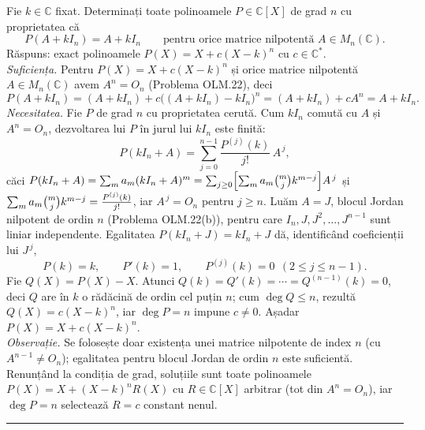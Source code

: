 Fie $k\in\mathbb{C}$ fixat. Determinați toate polinoamele $P\in\mathbb{C}[X]$ de grad $n$ cu proprietatea că
\[ P(A+kI_n)=A+kI_n\qquad\text{pentru orice matrice nilpotentă } A\in M_n(\mathbb{C}). \]
\sol Răspuns: exact polinoamele $P(X)=X+c(X-k)^n$ cu $c\in\mathbb{C}^{*}$.\\[2pt]
\emph{Suficiența.} Pentru $P(X)=X+c(X-k)^n$ și orice matrice nilpotentă $A\in M_n(\mathbb{C})$ avem $A^n=O_n$ (Problema OLM.22), deci
\[ P(A+kI_n)=(A+kI_n)+c\bigl((A+kI_n)-kI_n\bigr)^n=(A+kI_n)+cA^n=A+kI_n. \]
\emph{Necesitatea.} Fie $P$ de grad $n$ cu proprietatea cerută. Cum $kI_n$ comută cu $A$ și $A^n=O_n$, dezvoltarea lui $P$ în jurul lui $kI_n$ este finită:
\[ P(kI_n+A)=\sum_{j=0}^{n-1}\frac{P^{(j)}(k)}{j!}\,A^{\,j}, \]
căci $P(kI_n+A)=\sum_m a_m(kI_n+A)^m=\sum_{j\ge0}\Bigl[\sum_m a_m\tbinom{m}{j}k^{m-j}\Bigr]A^{\,j}$ și $\sum_m a_m\tbinom{m}{j}k^{m-j}=\tfrac{P^{(j)}(k)}{j!}$, iar $A^{\,j}=O_n$ pentru $j\ge n$. Luăm $A=J$, blocul Jordan nilpotent de ordin $n$ (Problema OLM.22(b)), pentru care $I_n,J,J^2,\dots,J^{n-1}$ sunt liniar independente. Egalitatea $P(kI_n+J)=kI_n+J$ dă, identificând coeficienții lui $J^{\,j}$,
\[ P(k)=k,\qquad P'(k)=1,\qquad P^{(j)}(k)=0\ \ (2\le j\le n-1). \]
Fie $Q(X)=P(X)-X$. Atunci $Q(k)=Q'(k)=\cdots=Q^{(n-1)}(k)=0$, deci $Q$ are în $k$ o rădăcină de ordin cel puțin $n$; cum $\deg Q\le n$, rezultă $Q(X)=c(X-k)^n$, iar $\deg P=n$ impune $c\neq0$. Așadar $P(X)=X+c(X-k)^n$.\\[2pt]
\emph{Observație.} Se folosește doar existența unei matrice nilpotente de index $n$ (cu $A^{n-1}\neq O_n$); egalitatea pentru blocul Jordan de ordin $n$ este suficientă. Renunțând la condiția de grad, soluțiile sunt toate polinoamele $P(X)=X+(X-k)^n R(X)$ cu $R\in\mathbb{C}[X]$ arbitrar (tot din $A^n=O_n$), iar $\deg P=n$ selectează $R=c$ constant nenul.
\vspace{1mm}\hrule

